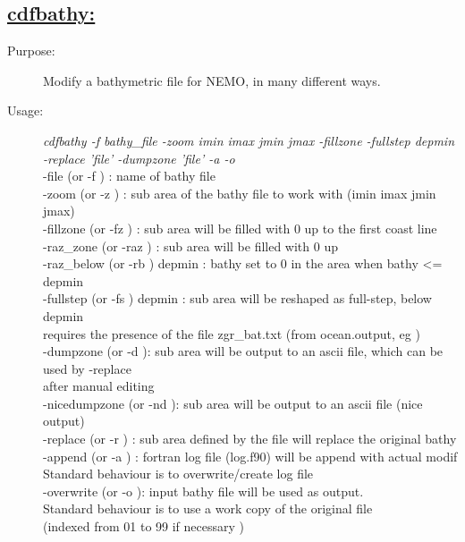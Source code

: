 \documentclass[a4paper,11pt]{article}
\begin{document}
\subsection*{\underline{cdfbathy:}}
\begin{description}
\item[Purpose:] Modify a bathymetric file for NEMO, in many different ways.
\item[Usage:] {\em cdfbathy -f bathy\_file -zoom imin imax jmin jmax -fillzone -fullstep depmin
      -replace 'file' -dumpzone 'file' -a -o } \\
   -file (or -f ) : name of bathy file \\
   -zoom (or -z ) : sub area of the bathy file to work with (imin imax jmin jmax) \\
   -fillzone (or -fz ) : sub area will be filled with 0 up to the first coast line \\
   -raz\_zone (or -raz ) : sub area will be filled with 0 up \\
   -raz\_below (or -rb ) depmin : bathy set to 0 in the area when bathy <= depmin \\
   -fullstep (or -fs ) depmin  : sub area will be reshaped as full-step, below depmin \\
               requires the presence of the file zgr\_bat.txt (from ocean.output, eg ) \\
   -dumpzone (or -d ): sub area will be output to an ascii file, which can be used by -replace \\
               after manual editing \\
   -nicedumpzone (or -nd ): sub area will be output to an ascii file (nice output) \\
   -replace (or -r ) : sub area defined by the file will replace the original bathy \\
   -append (or -a )  : fortran log file (log.f90) will be append with actual modif \\
              Standard behaviour is to overwrite/create log file \\
   -overwrite (or -o ): input bathy file will be used as output. \\
              Standard behaviour is to use a work copy of the original file \\
               (indexed from 01 to 99 if necessary ) 


\end{description}
\end{document}

